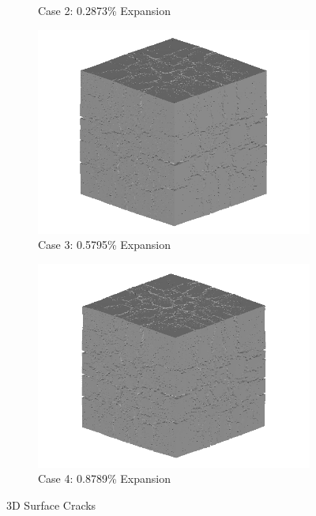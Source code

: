 \begin{figure}[!h]
\begin{subfigure}{.5\textwidth}
    \caption{Case 2: 0.2873\% Expansion}
    \end{subfigure}%
    \begin{subfigure}{.5\textwidth}
      \centering
      \includegraphics[width=.8\linewidth]{Files/exp_3D/DEF/A30X0C_3_3d.png}
    \caption{Case 3: 0.5795\% Expansion}
    \end{subfigure}
    \begin{subfigure}{.5\textwidth}
      \centering
      \includegraphics[width=.8\linewidth]{Files/exp_3D/DEF/A30X0C_4_3d.png}
    \caption{Case 4: 0.8789\% Expansion}
    \end{subfigure}%

  \caption{3D Surface Cracks}
  \label{fig:DEF_A30X0C_3D}
\end{figure}

